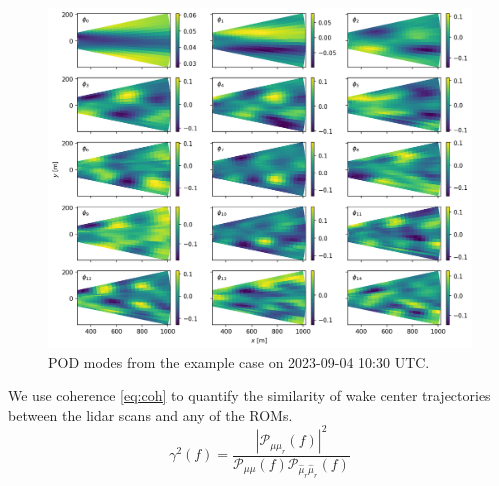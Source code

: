 \documentclass[%
 aip,
 amsmath,
 amssymb,
preprint,%
]{revtex4-2}
\begin{document}
\begin{figure}[h]
  \centering
  \includegraphics[width=\textwidth]{figs/all_modes_20240826.png}
  \caption{POD modes from the example case on 2023-09-04 10:30 UTC.}
  \label{fig:allModes}
\end{figure}

We use coherence \cref{eq:coh} to quantify the similarity of wake center trajectories between the lidar scans and any of the ROMs.
\begin{equation}
  \gamma^2(f) = \frac{|\mathcal{P}_{\mu\hat{\mu}_r}(f)|^2}{\mathcal{P}_{\mu\mu}(f) \mathcal{P}_{\hat{\mu}_r\hat{\mu}_r}(f)}
\label{eq:coh}
\end{equation}




\end{document}
